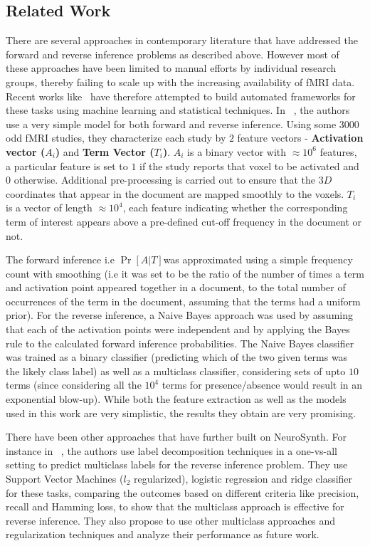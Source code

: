 \documentclass[11pt]{article}
\begin{document}
\subsection{Related Work}
There are several approaches in contemporary literature that have addressed the forward and reverse inference problems as described above. However most of these approaches have been limited to manual efforts by individual research groups, thereby failing to scale up with the increasing availability of fMRI data. Recent works like~\cite{yarkoni2011large, sanmi2013multi} have therefore attempted to build automated frameworks for these tasks using machine learning and statistical techniques.  In ~\cite{yarkoni2011large}, the authors use a very simple model for both forward and reverse inference. Using some $3000$ odd fMRI studies, they characterize each study by $2$ feature vectors - \textbf{Activation vector ($A_i$)} and \textbf{Term Vector ($T_i$)}.  $A_i$ is a binary vector with $\approx 10^6$ features, a particular feature is set to $1$ if the study reports that voxel to be activated and $0$ otherwise. Additional pre-processing is carried out to ensure that the $3D$ coordinates that appear in the document are mapped smoothly to the voxels. $T_i$  is a vector of length $\approx 10^4$, each feature indicating whether the corresponding term of interest appears above a pre-defined cut-off frequency in the document or not. 

The forward inference i.e $\Pr[A \vert T] $was approximated using a simple frequency count with smoothing (i.e it was set to be the ratio of the number of times a term and activation point appeared together in a document, to the total  number of occurrences of the term in the document, assuming that the terms had a uniform prior). For the reverse inference,  a Naive Bayes approach was used by assuming that each of the activation points were independent and by applying the Bayes rule to the calculated forward inference probabilities. The Naive Bayes classifier was trained as a binary classifier (predicting which of the two given terms was the likely class label) as well as a multiclass classifier, considering sets of upto $10$ terms (since considering all the $10^4$ terms for presence/absence would result in an exponential blow-up). While both the feature extraction as well as the models used in this work are very simplistic, the results they obtain are very promising. 

There have been other approaches that have further built on NeuroSynth. For instance in ~\cite{sanmi2013multi}, the authors use label decomposition techniques in a one-vs-all setting to predict multiclass labels for the reverse inference problem. They use Support Vector Machines ($l_2$ regularized), logistic regression and ridge classifier for these tasks,  comparing the outcomes based on different criteria like precision, recall and Hamming loss, to show that the multiclass approach is effective for reverse inference. They also propose to use other multiclass approaches and regularization techniques and analyze their performance as future work. 
\end{document}
